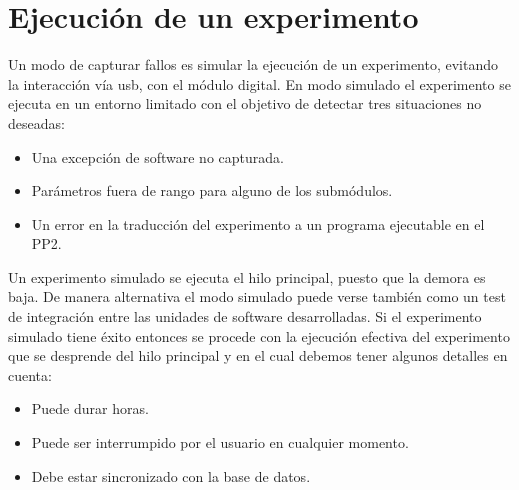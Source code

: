 \section{Ejecuci\'on de un experimento}

Un modo de capturar fallos es simular la ejecuci\'on de un experimento,
evitando la interacci\'on v\'ia usb, con el m\'odulo digital.
En modo simulado el experimento se ejecuta en un entorno limitado con el objetivo de
detectar tres situaciones no deseadas:

\begin{itemize}
\item Una excepci\'on de software no capturada.
\item Par\'ametros fuera de rango para alguno de los subm\'odulos.
\item Un error en la traducci\'on del experimento a un programa ejecutable en el PP2.
\end{itemize}

Un experimento simulado se ejecuta el hilo principal, puesto que 
la demora es baja. De manera alternativa el modo simulado puede verse tambi\'en como un 
test de integraci\'on entre las unidades de software desarrolladas.
Si el experimento simulado tiene \'exito entonces se procede con la ejecuci\'on efectiva
del experimento que se desprende del hilo principal y en el cual debemos tener 
algunos detalles en cuenta:

\begin{itemize}
    \item Puede durar horas.
    \item Puede ser interrumpido por el usuario en cualquier momento.
    \item Debe estar sincronizado con la base de datos.
\end{itemize}
\newpage